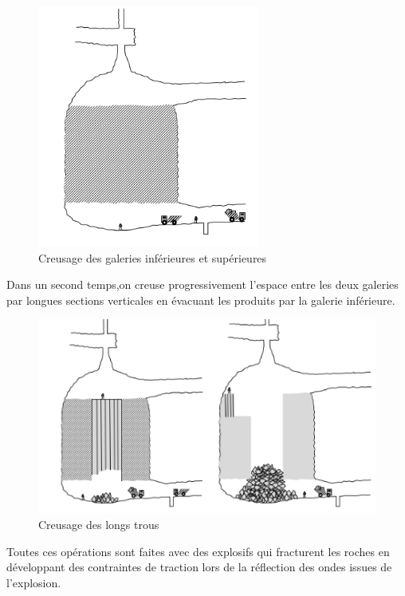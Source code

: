 \documentclass[11pt,french,a4paper]{article}
\begin{document}
\begin{figure}[!h]
  \centering
  \includegraphics[width=.8\linewidth]{image/annexe/chap2/figure4iiacreusagegalerie.png}
  \caption{Creusage des galeries inférieures et supérieures}
  \end{figure}

Dans un second temps,on creuse progressivement l’espace entre les deux galeries par longues sections verticales en évacuant les produits par la galerie inférieure.

\begin{figure}[!h]
  \centering
  \includegraphics[width=.8\linewidth]{image/annexe/chap2/figure4iibcreusagegalerie.png}
  \caption{Creusage des longs trous}
  \end{figure}

Toutes ces opérations sont faites avec des explosifs qui fracturent les roches en développant des contraintes de traction lors de la réflection des ondes  issues de l’explosion.
\end{document}
